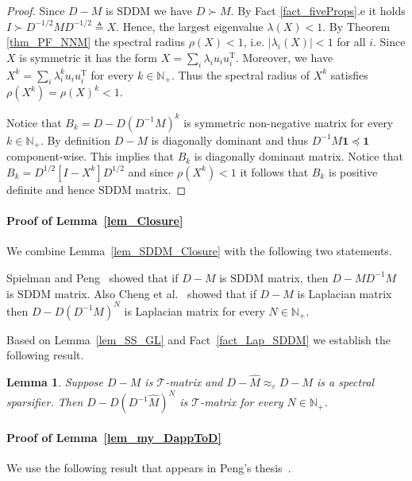 \documentclass[11pt]{article}
\newcommand{\SDDM}{\mathrm{SDDM}}
\newcommand{\GL}{\mathcal{T}}
\newcommand{\hM}{\widehat{M}}
\newcommand{\Di}{D^{-1}}
\newcommand{\Dhp}{D^{1/2}}
\newcommand{\Dhm}{D^{-1/2}}
\newcommand{\N}{\mathbb{N}}
\newcommand{\rot}{\mathrm{T}}
\newcommand{\eps}{\epsilon}
\renewcommand{\eps}{\varepsilon}
\newtheorem{lem}[thm]{Lemma}
\numberwithin{thm}{section}
\newcommand{\mat}[1]{\boldsymbol{\mathbf{#1}}}
\begin{document}
\begin{proof}
Since $D-M$ is $\SDDM$ we have $D\succ M$. By Fact \ref{fact_fiveProps}.e it holds $I\succ \Dhm M \Dhm\triangleq X$. Hence, the largest eigenvalue $\lambda(X)<1$. By Theorem \ref{thm_PF_NNM} the spectral radius $\rho(X)<1$, i.e. $|\lambda_i(X)|<1$ for all $i$. Since $X$ is symmetric it has the form $X=\sum_{i}\lambda_{i}u_{i}u_{i}^{\rot}$. Moreover, we have $X^k=\sum_{i}\lambda_{i}^{k}u_{i}u_{i}^{\rot}$ for every $k\in\N_{+}$. Thus the spectral radius of $X^k$ satisfies $\rho(X^{k})=\rho(X)^{k}<1$.

Notice that $B_k = D-D(\Di M)^{k}$ is symmetric non-negative matrix for every $k\in\N_{+}$. By definition $D-M$ is diagonally dominant and thus $\Di M\mat{1}\preceq\mat{1}$ component-wise. This implies that $B_k$ is diagonally dominant matrix. Notice that $B_k = \Dhp[ I - X^{k} ]\Dhp$ and since $\rho(X^{k})<1$ it follows that $B_k$ is positive definite and hence $\SDDM$ matrix.
\end{proof}

\paragraph*{Proof of Lemma~\ref{lem_Closure}} We combine Lemma~\ref{lem_SDDM_Closure} with the following two statements.

\begin{fact}\label{fact_Lap_SDDM}
Spielman and Peng~\cite[Proposition 5.6]{PS14} showed that if $D-M$ is $\SDDM$ matrix, then $D-M\Di M$ is $\SDDM$ matrix. Also Cheng et al.~\cite[Proposition 25]{CCLPT15} showed that if $D-M$ is Laplacian matrix then $D-D(\Di M)^N$ is Laplacian matrix for every $N\in\N_{+}$.
\end{fact}

Based on Lemma~\ref{lem_SS_GL} and Fact~\ref{fact_Lap_SDDM} we establish the following result.

\begin{lem}\label{lem_Lap_SDDM_Sparsifiers}
Suppose $D-M$ is $\GL$-matrix and $D-\hM\approx_{\eps}D-M$ is a spectral sparsifier. Then $D-D(\Di \hM)^{N}$ is $\GL$-matrix for every $N\in\N_{+}$.
\end{lem}


\paragraph*{Proof of Lemma~\ref{lem_my_DappToD}} We use the following result that appears in Peng's thesis~\cite{PengPhd13}.
\end{document}
